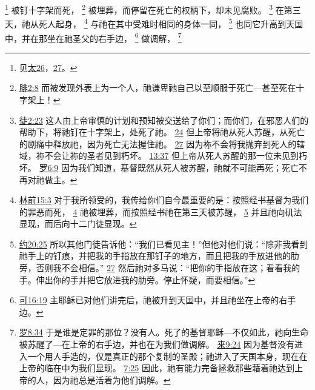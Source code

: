 \documentclass[12pt, a4paper, oneside]{ctexart}
\begin{document}
	\footnote {
		见\href{https://biblehub.com/niv/matthew/26.htm}{太26}，\href{https://biblehub.com/niv/matthew/26.htm}{27}。
	}
	被钉十字架而死，
	\footnote {
		\href{https://biblehub.com/philippians/2-8.htm}{腓2:8} 而被发现外表上为一个人，祂谦卑祂自己以至顺服于死亡---甚至死在十字架上！
	}
	被埋葬，而停留在死亡的权柄下，却未见腐败。
	\footnote {
		\href{https://biblehub.com/acts/2-23.htm}{徒2:23} 这人由上帝审慎的计划和预知被交送给了你们；而你们，在邪恶人们的帮助下，将祂钉在十字架上，处死了祂。
		\href{https://biblehub.com/acts/2-24.htm}{24} 但上帝将祂从死人苏醒，从死亡的剧痛中释放祂，因为死亡无法握住祂。
		\href{https://biblehub.com/acts/2-27.htm}{27} 因为祢不会将我抛弃到死人的辖域，祢不会让祢的圣者见到朽坏。
		\href{https://biblehub.com/acts/13-37.htm}{13:37} 但上帝从死人苏醒的那一位未见到朽坏。
		\href{https://biblehub.com/romans/6-9.htm}{罗6:9} 因为我们知道，基督既然从死人被苏醒，祂就不可能再死；死亡不再对祂做主。
	}
	在第三天，祂从死人起身，
	\footnote {
		\href{https://biblehub.com/1_corinthians/15-3.htm}{林前15:3} 对于我所领受的，我传给你们自今最重要的是：按照经书基督为我们的罪恶而死，
		\href{https://biblehub.com/1_corinthians/15-4.htm}{4} 祂被埋葬，而按照经书祂在第三天被苏醒，
		\href{https://biblehub.com/1_corinthians/15-5.htm}{5} 并且祂向矶法显现，而后向十二门徒显现。
	}
	与祂在其中受难时相同的身体一同，
	\footnote {
		\href{https://biblehub.com/john/20-25.htm}{约20:25} 所以其他门徒告诉他：“我们已看见主！”但他对他们说：“除非我看到祂手上的钉痕，并把我的手指放在那钉子的地方，而且把我的手放进他的肋旁，否则我不会相信。”
		\href{https://biblehub.com/john/20-27.htm}{27} 然后祂对多马说：“把你的手指放在这；看看我的手。伸出你的手并把它放进我的肋旁。停止怀疑，而要相信。”
	}
	也同它升高到天国中，并在那坐在祂圣父的右手边，
	\footnote {
		\href{https://biblehub.com/mark/16-19.htm}{可16:19} 主耶稣已对他们讲完后，祂被升到天国中，并且祂坐在上帝的右手边。
	}
	做调解，
	\footnote {
		\href{https://biblehub.com/romans/8-34.htm}{罗8:34} 于是谁是定罪的那位？没有人。死了的基督耶稣---不仅如此，祂向生命被苏醒了---在上帝的右手边，并也在为我们做调解。
		\href{https://biblehub.com/hebrews/9-24.htm}{来9:24} 因为基督没有进入一个用人手造的，仅是真正的那个复制的圣殿；祂进入了天国本身，现在在上帝的临在中为我们显现。
		\href{https://biblehub.com/hebrews/7-25.htm}{7:25} 因此，祂有能力完备拯救那些藉着祂达到上帝的人，因为祂总是活着为他们调解。
	}
\end{document}
